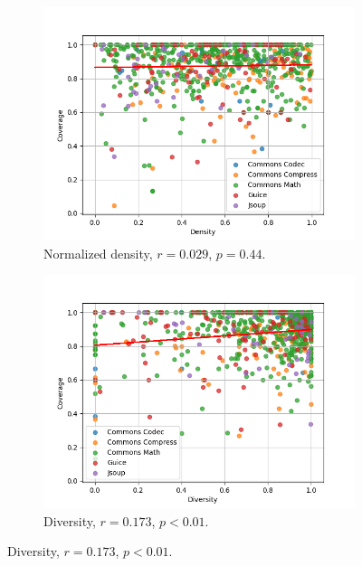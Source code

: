 \documentclass[twoside,a4paper,11pt]{memoir}
\begin{document}
\begin{figure}
    \centering
    \begin{subfigure}[b]{0.49\linewidth}
        \centering
        \includegraphics[width=\linewidth]{figures/coverage_density}
        \caption{Normalized density, \(r=0.029 \), \(p = 0.44 \).}%
        \label{fig:coverage_density}
    \end{subfigure}
    \hfill
    \begin{subfigure}[b]{0.49\linewidth}
        \centering
        \includegraphics[width=\linewidth]{figures/coverage_diversity}
        \caption{Diversity, \(r=0.173 \), \(p < 0.01 \).}%
        \label{fig:coverage_diversity}
    \end{subfigure}

\end{figure}
\end{document}

